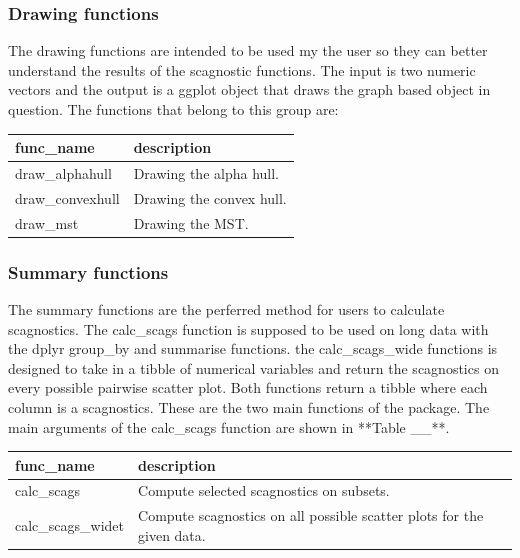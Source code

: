 \hypertarget{drawing-functions}{%
\subsubsection{Drawing functions}\label{drawing-functions}}

The drawing functions are intended to be used my the user so they can
better understand the results of the scagnostic functions. The input is
two numeric vectors and the output is a ggplot object that draws the
graph based object in question. The functions that belong to this group
are:

\begin{Schunk}

\begin{tabular}{l|l}
\hline
func\_name & description\\
\hline
draw\_alphahull & Drawing the alpha hull.\\
\hline
draw\_convexhull & Drawing the convex hull.\\
\hline
draw\_mst & Drawing the MST.\\
\hline
\end{tabular}

\end{Schunk}

\hypertarget{summary-functions}{%
\subsubsection{Summary functions}\label{summary-functions}}

The summary functions are the perferred method for users to calculate
scagnostics. The calc\_scags function is supposed to be used on long
data with the dplyr group\_by and summarise functions. the
calc\_scags\_wide functions is designed to take in a tibble of numerical
variables and return the scagnostics on every possible pairwise scatter
plot. Both functions return a tibble where each column is a scagnostics.
These are the two main functions of the package. The main arguments of
the calc\_scags function are shown in **Table \_\_**.

\begin{Schunk}

\begin{tabular}{l|l}
\hline
func\_name & description\\
\hline
calc\_scags & Compute selected scagnostics on subsets.\\
\hline
calc\_scags\_widet & Compute scagnostics on all possible scatter plots for the given data.\\
\hline
\end{tabular}

\end{Schunk}

